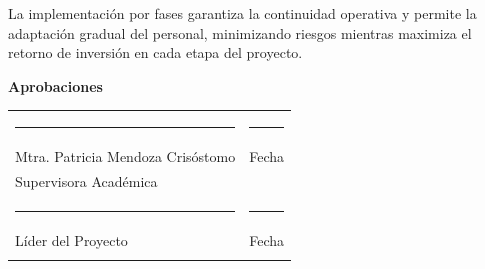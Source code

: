 \documentclass[12pt,letterpaper]{article}
\begin{document}
La implementación por fases garantiza la continuidad operativa y permite la adaptación gradual del personal, minimizando riesgos mientras maximiza el retorno de inversión en cada etapa del proyecto.

\vspace{2cm}

\begin{center}
\textbf{Aprobaciones}

\vspace{1.5cm}

\begin{tabular}{>{\centering}p{6cm}>{\centering\arraybackslash}p{6cm}}
\rule{5cm}{0.4pt} & \rule{5cm}{0.4pt} \\[0.5cm]
Mtra. Patricia Mendoza Crisóstomo & Fecha \\
Supervisora Académica & \\[1cm]
\rule{5cm}{0.4pt} & \rule{5cm}{0.4pt} \\[0.5cm]
Líder del Proyecto & Fecha \\
& \\
\end{tabular}
\end{center}
\end{document}
